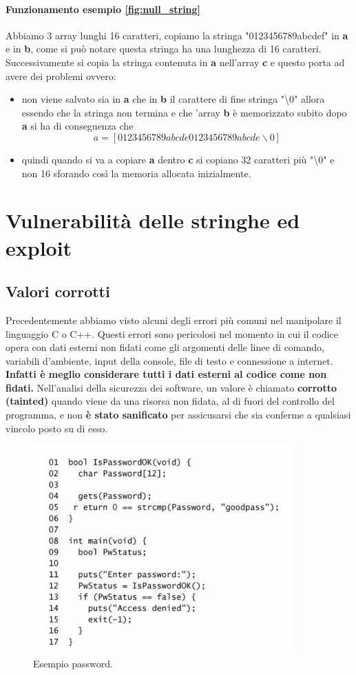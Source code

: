 \paragraph{Funzionamento esempio \ref{fig:null_string}}
Abbiamo 3 array lunghi 16 caratteri, copiamo la stringa "0123456789abcdef" in \textbf{a} e in \textbf{b}, come si può notare questa stringa ha una lunghezza di 16 caratteri. Successivamente si copia la stringa contenuta in \textbf{a} nell'array \textbf{c} e questo porta ad avere dei problemi ovvero:
\begin{itemize}
    \item non viene salvato sia in \textbf{a} che in \textbf{b} il carattere di fine stringa "\textbackslash0" allora essendo che la stringa non termina e che 'array \textbf{b} è memorizzato subito dopo \textbf{a} si ha di conseguenza che
          \[a = [0123456789abcde0123456789abcde\backslash 0]\]
    \item quindi quando si va a copiare \textbf{a} dentro \textbf{c} si copiano 32 caratteri più "\textbackslash0" e non 16 sforando così la memoria allocata inizialmente.
\end{itemize}
\section{Vulnerabilità delle stringhe ed exploit}
\subsection{Valori corrotti}
Precedentemente abbiamo visto alcuni degli errori più comuni nel manipolare il linguaggio C o C++. Questi errori sono pericolosi nel momento in cui il codice opera con dati esterni non fidati come gli argomenti delle linee di comando, variabili d'ambiente, input della console, file di testo e connessione a internet. \textbf{Infatti è meglio considerare tutti i dati esterni al codice come non fidati. } Nell'analisi della sicurezza dei software, un valore è chiamato \textbf{corrotto (tainted)} quando viene da una risorsa non fidata, al di fuori del controllo del programma, e non \textbf{è stato sanificato} per assicusarsi che sia conferme a qualsiasi vincolo posto su di esso.
\begin{figure}[H]
    \centering
    \includegraphics[width=10cm, keepaspectratio]{capitoli/secure_coding/img/cap_2/password_example.png}
    \caption{Esempio password.}\label{fig:password}
\end{figure}

